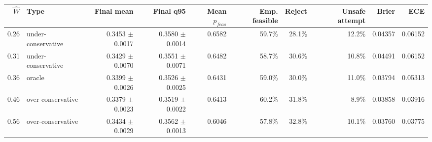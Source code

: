 \begin{tabular}{rlrrrrrrrr}
\toprule
$\hat{W}$ & Type & Final mean & Final q95 & Mean $p_{feas}$ & Emp. feasible & Reject & Unsafe attempt & Brier & ECE \\
\midrule
0.26 & under-conservative & 0.3453 $\pm$ 0.0017 & 0.3580 $\pm$ 0.0014 & 0.6582 & 59.7\% & 28.1\% & 12.2\% & 0.04357 & 0.06152 \\
0.31 & under-conservative & 0.3429 $\pm$ 0.0070 & 0.3551 $\pm$ 0.0071 & 0.6482 & 58.7\% & 30.6\% & 10.8\% & 0.04491 & 0.06152 \\
0.36 & oracle & 0.3399 $\pm$ 0.0026 & 0.3526 $\pm$ 0.0025 & 0.6431 & 59.0\% & 30.0\% & 11.0\% & 0.03794 & 0.05313 \\
0.46 & over-conservative & 0.3379 $\pm$ 0.0023 & 0.3519 $\pm$ 0.0022 & 0.6413 & 60.2\% & 31.8\% & 8.9\% & 0.03858 & 0.03916 \\
0.56 & over-conservative & 0.3434 $\pm$ 0.0029 & 0.3562 $\pm$ 0.0013 & 0.6046 & 57.8\% & 32.8\% & 10.1\% & 0.03760 & 0.03775 \\
\bottomrule
\end{tabular}
